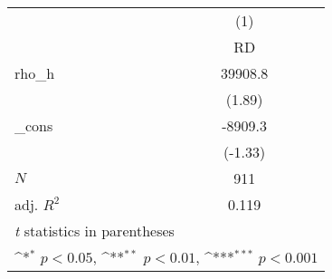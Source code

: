 {
\def\sym#1{\ifmmode^{#1}\else\(^{#1}\)\fi}
\begin{tabular}{l*{1}{c}}
\toprule
            &\multicolumn{1}{c}{(1)}\\
            &\multicolumn{1}{c}{RD}\\
\midrule
rho\_h       &     39908.8         \\
            &      (1.89)         \\
\addlinespace
\_cons      &     -8909.3         \\
            &     (-1.33)         \\
\midrule
\(N\)       &         911         \\
adj. \(R^{2}\)&       0.119         \\
\bottomrule
\multicolumn{2}{l}{\footnotesize \textit{t} statistics in parentheses}\\
\multicolumn{2}{l}{\footnotesize \sym{*} \(p<0.05\), \sym{**} \(p<0.01\), \sym{***} \(p<0.001\)}\\
\end{tabular}
}
